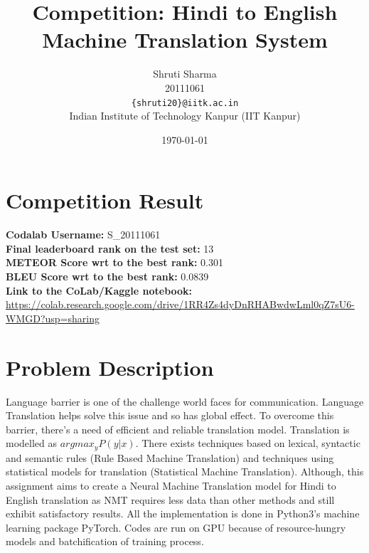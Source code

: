 \documentclass[11pt, oneside]{article}   	%
\title{Competition: Hindi to English Machine Translation System}
\author{
    Shruti Sharma  \\ 
    20111061\\
   {\tt \{shruti20\}@iitk.ac.in}\\
{Indian Institute of Technology Kanpur (IIT Kanpur)}
}
\date{\today}							%
\begin{document}
\maketitle


\section{Competition Result}
\textbf{Codalab Username:} S\_20111061 \\
\textbf{Final leaderboard rank on the test set:} 13 \\
\textbf{METEOR Score wrt to the best rank:} 0.301 \\
\textbf{BLEU Score wrt to the best rank:}  0.0839\\ 
\textbf{Link to the CoLab/Kaggle notebook:}
\url{https://colab.research.google.com/drive/1RR4Zs4dyDnRHABwdwLml0qZ7sU6-WMGD?usp=sharing}

\section{Problem Description}
Language barrier is one of the challenge world faces for communication. Language Translation helps solve this issue and so has global effect. To overcome this barrier, there's a need of efficient and reliable translation model. Translation is modelled as $argmax_{y}{P(y|x)}$. There exists techniques based on lexical, syntactic and semantic rules (Rule Based Machine Translation) and techniques using statistical models for translation (Statistical Machine Translation). Although, this assignment aims to create a Neural Machine Translation model for Hindi to English translation as NMT requires less data than other methods and still exhibit satisfactory results. All the implementation is done in Python3's machine learning package PyTorch. Codes are run on GPU because of resource-hungry models and batchification of training process.
\end{document}
